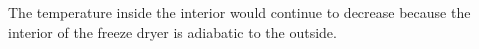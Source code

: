 The temperature inside the interior would continue to decrease because the interior of the freeze dryer is adiabatic to the outside.
